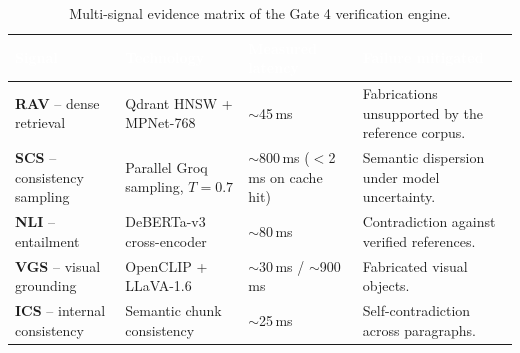 \documentclass[11pt,a4paper]{article}
\newcommand{\hc}[1]{\textcolor{white}{\textbf{#1}}}
\newcommand{\hdrrow}{\rowcolor{primarynavy}}
\begin{document}
\begin{table}[!htbp]
\centering\small
\renewcommand{\arraystretch}{1.2}
\begin{tabularx}{\linewidth}{@{}L{3.2cm} L{3.6cm} L{2.4cm} Y@{}}
\hdrrow \hc{Signal} & \hc{Technology} & \hc{Measured latency} & \hc{Failure mitigated}\\
\toprule
\textbf{RAV} -- dense retrieval & Qdrant HNSW + MPNet-768 \cite{song2020} & $\sim$45\,ms & Fabrications unsupported by the reference corpus.\\
\textbf{SCS} -- consistency sampling & Parallel Groq sampling, $T=0.7$ & $\sim$800\,ms ($<$2\,ms on cache hit) & Semantic dispersion under model uncertainty.\\
\textbf{NLI} -- entailment & DeBERTa-v3 cross-encoder \cite{he2021v3} & $\sim$80\,ms & Contradiction against verified references.\\
\textbf{VGS} -- visual grounding & OpenCLIP + LLaVA-1.6 & $\sim$30\,ms / $\sim$900\,ms & Fabricated visual objects.\\
\textbf{ICS} -- internal consistency & Semantic chunk consistency & $\sim$25\,ms & Self-contradiction across paragraphs.\\
\bottomrule
\end{tabularx}
\caption{Multi-signal evidence matrix of the Gate 4 verification engine.}
\label{tab:signals_matrix}
\end{table}
\end{document}
